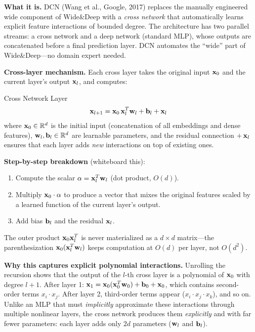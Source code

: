 \textbf{What it is.} DCN (Wang et al., Google, 2017) replaces the manually engineered wide component of Wide\&Deep with a \textit{cross network} that automatically learns explicit feature interactions of bounded degree. The architecture has two parallel streams: a cross network and a deep network (standard MLP), whose outputs are concatenated before a final prediction layer. DCN automates the ``wide'' part of Wide\&Deep---no domain expert needed.

\textbf{Cross-layer mechanism.} Each cross layer takes the original input $\mathbf{x}_0$ and the current layer's output $\mathbf{x}_l$, and computes:

\begin{mathresult}{Cross Network Layer}
\begin{equation}
\mathbf{x}_{l+1} = \mathbf{x}_0 \, \mathbf{x}_l^T \mathbf{w}_l + \mathbf{b}_l + \mathbf{x}_l
\end{equation}
where $\mathbf{x}_0 \in \mathbb{R}^d$ is the initial input (concatenation of all embeddings and dense features), $\mathbf{w}_l, \mathbf{b}_l \in \mathbb{R}^d$ are learnable parameters, and the residual connection $+\,\mathbf{x}_l$ ensures that each layer adds \textit{new} interactions on top of existing ones.
\end{mathresult}

\textbf{Step-by-step breakdown} (whiteboard this):
\begin{enumerate}
    \item Compute the scalar $\alpha = \mathbf{x}_l^T \mathbf{w}_l$ (dot product, $O(d)$).
    \item Multiply $\mathbf{x}_0 \cdot \alpha$ to produce a vector that mixes the original features scaled by a learned function of the current layer's output.
    \item Add bias $\mathbf{b}_l$ and the residual $\mathbf{x}_l$.
\end{enumerate}
The outer product $\mathbf{x}_0 \mathbf{x}_l^T$ is never materialized as a $d \times d$ matrix---the parenthesization $\mathbf{x}_0 (\mathbf{x}_l^T \mathbf{w}_l)$ keeps computation at $O(d)$ per layer, not $O(d^2)$.

\textbf{Why this captures explicit polynomial interactions.} Unrolling the recursion shows that the output of the $l$-th cross layer is a polynomial of $\mathbf{x}_0$ with degree $l+1$. After layer 1: $\mathbf{x}_1 = \mathbf{x}_0 (\mathbf{x}_0^T \mathbf{w}_0) + \mathbf{b}_0 + \mathbf{x}_0$, which contains second-order terms $x_i \cdot x_j$. After layer 2, third-order terms appear ($x_i \cdot x_j \cdot x_k$), and so on. Unlike an MLP that must \textit{implicitly} approximate these interactions through multiple nonlinear layers, the cross network produces them \textit{explicitly} and with far fewer parameters: each layer adds only $2d$ parameters ($\mathbf{w}_l$ and $\mathbf{b}_l$).

